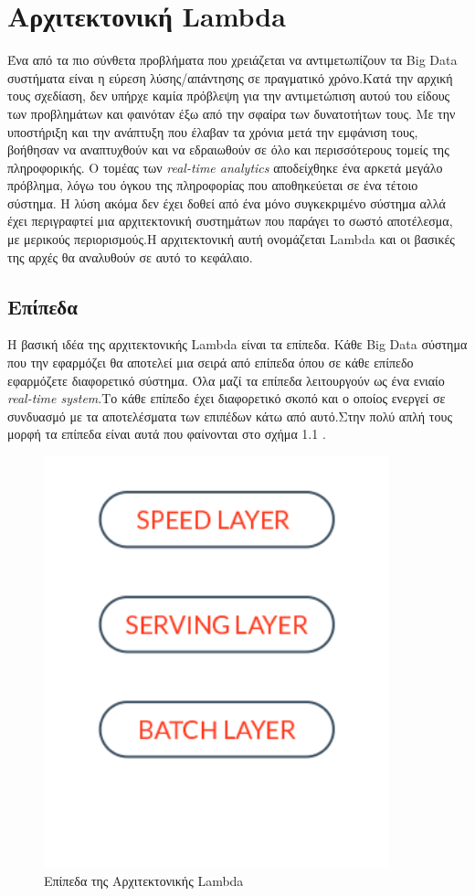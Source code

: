 \chapter{Αρχιτεκτονική Lambda}
Ένα από τα πιο σύνθετα προβλήματα που χρειάζεται να αντιμετωπίζουν τα Big Data συστήματα είναι η εύρεση λύσης/απάντησης σε πραγματικό χρόνο.Κατά την αρχική τους σχεδίαση, δεν υπήρχε καμία πρόβλεψη για την αντιμετώπιση αυτού του είδους των προβλημάτων και φαινόταν έξω από την σφαίρα των δυνατοτήτων τους. Με την υποστήριξη και την ανάπτυξη που έλαβαν τα χρόνια μετά την εμφάνιση τους, βοήθησαν να αναπτυχθούν και να εδραιωθούν σε όλο και περισσότερους τομείς της πληροφορικής. Ο τομέας των \textit{real-time analytics} αποδείχθηκε ένα αρκετά μεγάλο πρόβλημα, λόγω του όγκου της πληροφορίας που αποθηκεύεται σε ένα τέτοιο σύστημα. Η λύση ακόμα δεν έχει δοθεί από ένα μόνο συγκεκριμένο σύστημα αλλά έχει περιγραφτεί μια αρχιτεκτονική συστημάτων που παράγει το σωστό αποτέλεσμα, με μερικούς περιορισμούς.Η αρχιτεκτονική αυτή ονομάζεται Lambda και οι βασικές της αρχές θα αναλυθούν σε αυτό το κεφάλαιο.

\section{Επίπεδα}
Η βασική ιδέα της αρχιτεκτονικής Lambda είναι τα επίπεδα. Κάθε Big Data σύστημα που την εφαρμόζει θα αποτελεί μια σειρά από επίπεδα όπου σε κάθε επίπεδο εφαρμόζετε διαφορετικό σύστημα. Όλα μαζί τα επίπεδα λειτουργούν ως ένα ενιαίο \textit{real-time system}.Το κάθε επίπεδο έχει διαφορετικό σκοπό και ο οποίος ενεργεί σε συνδυασμό με τα αποτελέσματα των επιπέδων κάτω από αυτό.Στην πολύ απλή τους μορφή τα επίπεδα είναι αυτά που φαίνονται στο σχήμα 1.1 .

\begin{figure}[t]
\caption{Επίπεδα της Αρχιτεκτονικής Lambda}
\includegraphics[width=10cm]{images/layers.png}
\centering
\end{figure}
\clearpage

